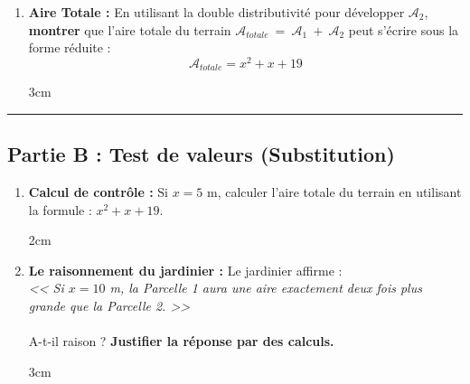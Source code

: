 \documentclass[a4paper]{book}
\begin{document}
\begin{exemple}
\begin{enumerate}[leftmargin=*]
            \item \textbf{Aire Totale :} En utilisant la double distributivité pour développer $\mathcal{A}_2$, \textbf{montrer} que l'aire totale du terrain $\mathcal{A}_{totale}~=~\mathcal{A}_1~+~\mathcal{A}_2$ peut s'écrire sous la forme réduite :
            \[ \mathcal{A}_{totale} = x^2 + x + 19 \]
            
            \begin{ZoneReponse}{3cm}
            \end{ZoneReponse}
        \end{enumerate}
        
        \hrule
        \vspace{0.5cm}
        
        \subsection*{Partie B : Test de valeurs (Substitution)}
        
        \begin{enumerate}[leftmargin=*]
            \item \textbf{Calcul de contrôle :} Si $x = 5$ m, calculer l'aire totale du terrain en utilisant la formule : $x^2 + x + 19$.
            \begin{ZoneReponse}{2cm}
            \end{ZoneReponse}
            
            \item \textbf{Le raisonnement du jardinier :} Le jardinier affirme : \\
            \textit{<< Si $x = 10$ m, la Parcelle 1 aura une aire exactement deux fois plus grande que la Parcelle 2. >>} \\\\
            A-t-il raison ? \textbf{Justifier la réponse par des calculs.}
            \begin{ZoneReponse}{3cm}
            \end{ZoneReponse}
        \end{enumerate}
    \end{exemple}
\end{document}
